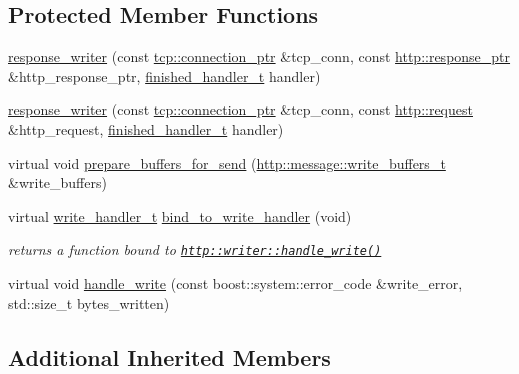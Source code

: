\subsection*{Protected Member Functions}
\begin{DoxyCompactItemize}
\item 
\hyperlink{classpion_1_1http_1_1response__writer_a7f98f36406b5331910b39498d4c8f057}{response\-\_\-writer} (const \hyperlink{namespacepion_1_1tcp_a6c9b7497068009f6d81d95ec0b0627d6}{tcp\-::connection\-\_\-ptr} \&tcp\-\_\-conn, const \hyperlink{namespacepion_1_1http_af92bc593f2514fe8733175dafec7cd33}{http\-::response\-\_\-ptr} \&http\-\_\-response\-\_\-ptr, \hyperlink{classpion_1_1http_1_1writer_a7e3ce4b88e0427adf673a99fca3af982}{finished\-\_\-handler\-\_\-t} handler)
\item 
\hyperlink{classpion_1_1http_1_1response__writer_aa7f7e240405e6d863bcb110e11a2191b}{response\-\_\-writer} (const \hyperlink{namespacepion_1_1tcp_a6c9b7497068009f6d81d95ec0b0627d6}{tcp\-::connection\-\_\-ptr} \&tcp\-\_\-conn, const \hyperlink{classpion_1_1http_1_1request}{http\-::request} \&http\-\_\-request, \hyperlink{classpion_1_1http_1_1writer_a7e3ce4b88e0427adf673a99fca3af982}{finished\-\_\-handler\-\_\-t} handler)
\item 
virtual void \hyperlink{classpion_1_1http_1_1response__writer_a5f18282e90307978ca33be6c4e4f7bf9}{prepare\-\_\-buffers\-\_\-for\-\_\-send} (\hyperlink{classpion_1_1http_1_1message_aacf9a6a7677c32e4ab764ac97d0b5e7b}{http\-::message\-::write\-\_\-buffers\-\_\-t} \&write\-\_\-buffers)
\item 
virtual \hyperlink{classpion_1_1http_1_1writer_a36fa31c850362d907559a0c1157a1bf3}{write\-\_\-handler\-\_\-t} \hyperlink{classpion_1_1http_1_1response__writer_a95b3d41b77828f8ec14862c03accb58a}{bind\-\_\-to\-\_\-write\-\_\-handler} (void)
\begin{DoxyCompactList}\small\item\em returns a function bound to \href{http::writer::handle_write()}{\tt http\-::writer\-::handle\-\_\-write()} \end{DoxyCompactList}\item 
virtual void \hyperlink{classpion_1_1http_1_1response__writer_a216d682fd204bd15e92b2babb55c216a}{handle\-\_\-write} (const boost\-::system\-::error\-\_\-code \&write\-\_\-error, std\-::size\-\_\-t bytes\-\_\-written)
\end{DoxyCompactItemize}
\subsection*{Additional Inherited Members}


